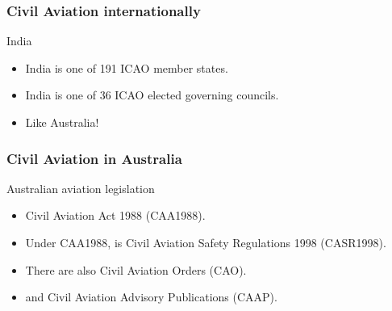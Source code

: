 \begin{frame}
\frametitle{Civil Aviation internationally}
\begin{block}{India}
\begin{itemize}
\item<1-> India is one of 191 ICAO member states.
\item<1-> India is one of 36 ICAO elected governing councils.
\item<2-> Like Australia!
\end{itemize}
\end{block}
\end{frame}

\begin{frame}
\frametitle{Civil Aviation in Australia}
\begin{block}{Australian aviation legislation}
\begin{itemize}
\item<1-> Civil Aviation Act 1988 (CAA1988).
\item<2-> Under CAA1988, is Civil Aviation Safety Regulations 1998 (CASR1998).
\item<3-> There are also Civil Aviation Orders (CAO).
\item<4-> and Civil Aviation Advisory Publications (CAAP).
\end{itemize}
\end{block}
\end{frame}
